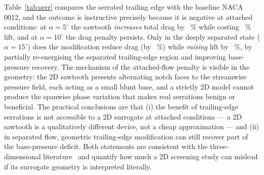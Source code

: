 \documentclass[11pt,a4paper]{article}
\begin{document}
Table~\ref{tab:serr} compares the serrated trailing edge with the baseline NACA 0012, and the outcome is instructive precisely because it is negative at attached conditions: at $\alpha = 5^\circ$ the sawtooth \emph{increases} total drag by \SerrCdIncrFive{}~\% while costing \SerrClDropFive{}~\% lift, and at $\alpha = 10^\circ$ the drag penalty persists. Only in the deeply separated state ($\alpha = 15^\circ$) does the modification reduce drag (by \SerrCdDropFifteen{}~\%) while \emph{raising} lift by \SerrClRiseFifteen{}~\%, by partially re-energising the separated trailing-edge region and improving base-pressure recovery. The mechanism of the attached-flow penalty is visible in the geometry: the 2D sawtooth presents alternating notch faces to the streamwise pressure field, each acting as a small blunt base, and a strictly 2D model cannot produce the spanwise phase variation that makes real serrations benign or beneficial. The practical conclusions are that (i) the benefit of trailing-edge serrations is not accessible to a 2D surrogate at attached conditions --- a 2D sawtooth is a qualitatively different device, not a cheap approximation --- and (ii) in separated flow, geometric trailing-edge modification can still recover part of the base-pressure deficit. Both statements are consistent with the three-dimensional literature~\cite{howe1991,hansen2016} and quantify how much a 2D screening study can mislead if its surrogate geometry is interpreted literally.
\end{document}
